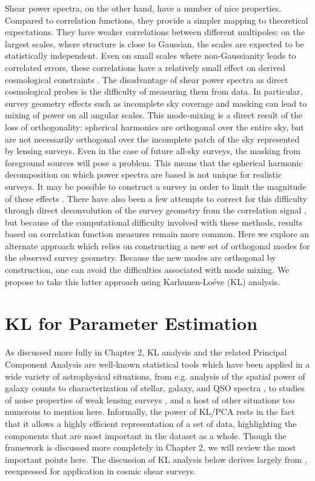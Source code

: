 Shear power spectra, on the other hand, have a number of nice properties.
Compared to correlation functions, they provide a simpler mapping
to theoretical expectations.  They have
weaker correlations between different multipoles: on the largest scales,
where structure is close to Gaussian, the scales are expected to be
statistically independent.
Even on small scales where non-Gaussianity leads to correlated errors,
these correlations have a relatively small effect on derived cosmological
constraints \citep{Takada09}.
The disadvantage of shear power spectra as direct cosmological probes is
the difficulty of measuring them from data.  In particular, survey geometry
effects such as incomplete sky coverage
and masking can lead to mixing of power on all angular scales.
This mode-mixing is a direct result of the loss of orthogonality:
spherical harmonics are orthogonal over the entire sky, but are not
necessarily orthogonal over the incomplete patch of the sky represented by
lensing surveys.  Even in the case of future all-sky surveys, the masking from
foreground sources will pose a problem.  This means
that the spherical harmonic decomposition on which power spectra are based
is not unique for realistic surveys.  
It may be possible to construct
a survey in order to limit the magnitude of these effects
\citep[see][for some approaches]{Kilbinger04, Kilbinger06}.
There have also been a few attempts to correct for this
difficulty through direct deconvolution of the survey geometry from
the correlation signal \citep{Brown03, Hikage11}, but because of the
computational difficulty involved with these methods,
results based on correlation function measures remain more common.
Here we explore an alternate approach which relies on constructing
a new set of orthogonal modes for the observed survey geometry.
Because the new modes are orthogonal by construction,
one can avoid the difficulties associated with mode mixing. We propose to
take this latter approach using Karhunen-Lo\'{e}ve (KL) analysis.

\section{KL for Parameter Estimation}
\label{sec:kl_intro}
As discussed more fully in Chapter 2,
KL analysis and the related Principal Component Analysis are well-known
statistical tools which have been applied in a wide variety of astrophysical
situations, from e.g. analysis of the spatial power of galaxy counts
\citep{Vogeley96, Szalay03, Pope04}
to characterization of stellar, galaxy, and QSO spectra
\citep{Connolly95, Connolly99, Yip04a, Yip04b},
to studies of noise properties of weak lensing surveys
\citep{Kilbinger06, Munshi06}, and a host of other situations too numerous
to mention here.  Informally, the power of KL/PCA rests in the fact that 
it allows a highly efficient representation of a set of data, highlighting
the components that are most important in the dataset as a whole.
Though the framework is discussed more completely in Chapter 2, we will
review the most important points here.
The discussion of KL analysis below derives largely from \citet{Vogeley96},
reexpressed for application in cosmic shear surveys.

